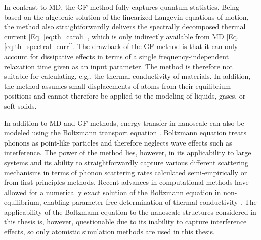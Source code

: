 In contrast to MD, the GF method fully captures quantum statistics. Being based on the algebraic solution of the linearized Langevin equations of motion, the method also straightforwardly delivers the spectrally decomposed thermal current [Eq. \eqref{eq:th_caroli}], which is only indirectly available from MD [Eq. \eqref{eq:th_spectral_curr}]. The drawback of the GF method is that it can only account for dissipative effects in terms of a single frequency-independent relaxation time given as an input parameter. The method is therefore not suitable for calculating, e.g., the thermal conductivity of materials. In addition, the method assumes small displacements of atoms from their equilibrium positions and cannot therefore be applied to the modeling of liquids, gases, or soft solids.

In addition to MD and GF methods, energy transfer in nanoscale can also be modeled using the Boltzmann transport equation \cite{ziman}. Boltzmann equation treats phonons as point-like particles and therefore neglects wave effects such as interference. The power of the method lies, however, in its applicability to large systems and its ability to straightforwardly capture various different scattering mechanisms in terms of phonon scattering rates calculated semi-empirically or from first principles methods. Recent advances in computational methods have allowed for a numerically exact solution of the Boltzmann equation in non-equi\-lib\-rium, enabling parameter-free determination of thermal conductivity \cite{broido07,ward09,lindsay13}. The applicability of the Boltzmann equation to the nanoscale structures considered in this thesis is, however, questionable due to its inability to capture interference effects, so only atomistic simulation methods are used in this thesis.
